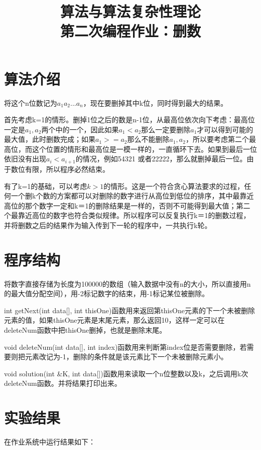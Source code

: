 ﻿\documentclass{article}
\begin{document}
\begin{CJK*}{GBK}{song}
\title{算法与算法复杂性理论\\ 第二次编程作业：删数}
\maketitle

\section{算法介绍}
\qquad 将这个n位数记为$a_1a_2...a_n$，现在要删掉其中k位，同时得到最大的结果。

首先考虑k=1的情形。删掉1位之后的数是n-1位，从最高位依次向下考虑：最高位一定是$a_1,a_2$两个中的一个，因此如果$a_1<a_2$那么一定要删除$a_1$才可以得到可能的最大值，此时删数完成；如果$a_1>=a_2$那么不能删除$a_1,a_2$，所以要考虑第二个最高位，而这个位置的情形和最高位是一模一样的，一直循环下去。如果到最后一位依旧没有出现$a_i<a_{i+1}$的情况，例如54321 或者22222，那么就删掉最后一位。由于数位有限，所以程序必然结束。

有了k=1的基础，可以考虑$k>1$的情形。这是一个符合贪心算法要求的过程，任何一个删k个数的方案都可以对删除的数字进行从高位到低位的排序，其中最靠近高位的那个数字一定和k＝1的删除结果是一样的，否则不可能得到最大值；第二个最靠近高位的数字也符合类似规律。所以程序可以反复执行k＝1的删数过程，并将删数之后的结果作为输入传到下一轮的程序中，一共执行k轮。



\section{程序结构}
\qquad 将数字直接存储为长度为100000的数组（输入数据中没有n的大小，所以直接用n的最大值分配空间），用-2标记数字的结束，用-1标记某位被删除。

int getNext(int data[], int thisOne)函数用来返回第thisOne元素的下一个未被删除元素的值，如果thisOne元素是末尾元素，那么返回10，这样一定可以在deleteNum函数中把thisOne删掉，也就是删除末尾。

void deleteNum(int data[], int index)函数用来判断第index位是否需要删除，若需要则把元素改记为-1，删除的条件就是该元素比下一个未被删除元素小。

void solution(int \&K, int data[])函数用来读取一个n位整数以及k，之后调用k次deleteNum函数。并将结果打印出来。



\section{实验结果}
\qquad 在作业系统中运行结果如下：

\begin{center}
\begin{figure}[ht]
\end{figure}
\end{center}


\end{CJK*}
\end{document}
